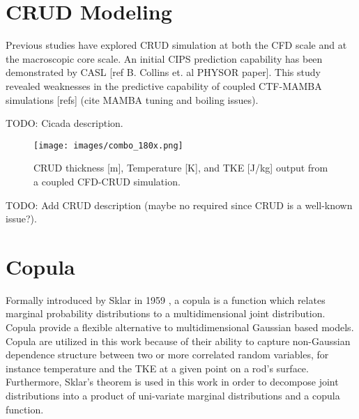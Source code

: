 \section{CRUD Modeling}

Previous studies have explored CRUD simulation at both the CFD scale and at the macroscopic core scale.   An initial CIPS prediction capability has been demonstrated by CASL [ref B. Collins et. al PHYSOR paper].  This study revealed weaknesses in the predictive capability of coupled CTF-MAMBA simulations [refs] (cite MAMBA tuning and boiling issues).

TODO: Cicada description.

\begin{figure}[!htbp]
\centering
\texttt{[image: images/combo\_180x.png]}
\caption{CRUD thickness [m], Temperature [K], and TKE [J/kg] output from a coupled CFD-CRUD simulation.}
\label{fig:cfd2ctf_map}
\end{figure}

TODO: Add CRUD description (maybe no required since CRUD is a well-known issue?).

\section{Copula}

Formally introduced by Sklar in 1959 \cite{Sklar1959}, a copula is a function which relates marginal probability distributions to a multidimensional joint distribution.  Copula provide a flexible alternative to multidimensional Gaussian based models.  Copula are utilized in this work because of their ability to capture non-Gaussian dependence structure between two or more correlated random variables, for instance temperature and the TKE at a given point on a rod's surface.  Furthermore, Sklar's theorem is used in this work in order to decompose joint distributions into a product of uni-variate marginal distributions and a copula function.  

